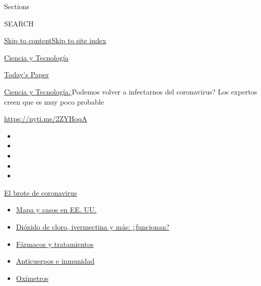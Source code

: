 Sections

SEARCH

\protect\hyperlink{site-content}{Skip to
content}\protect\hyperlink{site-index}{Skip to site index}

\href{https://www.nytimes.com/es/section/ciencia-y-tecnologia}{Ciencia y
Tecnología}

\href{https://myaccount.nytimes.com/auth/login?response_type=cookie\&client_id=vi}{}

\href{https://www.nytimes.com/section/todayspaper}{Today's Paper}

\href{/es/section/ciencia-y-tecnologia}{Ciencia y
Tecnología}\textbar{}¿Podemos volver a infectarnos del coronavirus? Los
expertos creen que es muy poco probable

\url{https://nyti.ms/2ZYHoqA}

\begin{itemize}
\item
\item
\item
\item
\item
\end{itemize}

\href{https://www.nytimes.com/es/spotlight/coronavirus?action=click\&pgtype=Article\&state=default\&region=TOP_BANNER\&context=storylines_menu}{El
brote de coronavirus}

\begin{itemize}
\tightlist
\item
  \href{https://www.nytimes.com/es/interactive/2020/espanol/mundo/coronavirus-en-estados-unidos.html?action=click\&pgtype=Article\&state=default\&region=TOP_BANNER\&context=storylines_menu}{Mapa
  y casos en EE. UU.}
\item
  \href{https://www.nytimes.com/es/2020/07/23/espanol/america-latina/bolivia-cloro-coronavirus-ivermectina.html?action=click\&pgtype=Article\&state=default\&region=TOP_BANNER\&context=storylines_menu}{Dióxido
  de cloro, ivermectina y más: ¿funcionan?}
\item
  \href{https://www.nytimes.com/es/interactive/2020/science/coronavirus-tratamientos-curas.html?action=click\&pgtype=Article\&state=default\&region=TOP_BANNER\&context=storylines_menu}{Fármacos
  y tratamientos}
\item
  \href{https://www.nytimes.com/es/2020/07/28/espanol/ciencia-y-tecnologia/anticuerpos-coronavirus-inmunidad.html?action=click\&pgtype=Article\&state=default\&region=TOP_BANNER\&context=storylines_menu}{Anticuerpos
  e inmunidad}
\item
  \href{https://www.nytimes.com/es/2020/04/29/espanol/estilos-de-vida/oximetro-para-que-sirve.html?action=click\&pgtype=Article\&state=default\&region=TOP_BANNER\&context=storylines_menu}{Oxímetros}
\end{itemize}

